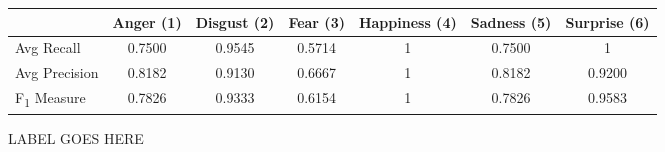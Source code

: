 \begin{figure}[h]
    \begin{tabular}{ | l || c | c | c | c | c | c | }
    \hline
          & Anger (1) & Disgust (2) & Fear (3) & Happiness (4) & Sadness (5) & Surprise (6) \\ \hline \hline
        Avg Recall & 0.7500 & 0.9545 & 0.5714 & 1 & 0.7500 & 1 \\ \hline
        Avg Precision & 0.8182 & 0.9130 & 0.6667 & 1 & 0.8182 & 0.9200 \\ \hline
        F\textsubscript{1} Measure & 0.7826 & 0.9333 & 0.6154 & 1 & 0.7826 &
        0.9583 \\ \hline
    \end{tabular}
    \caption{LABEL GOES HERE}
    \label{fig:averageRecall}
\end{figure}
